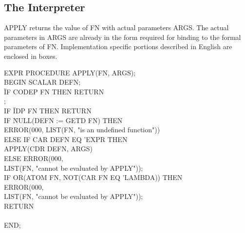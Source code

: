 \documentclass[11pt,letterpaper]{book}
\begin{document}
\subsection{The Interpreter}
\label{interpreter}
{APPLY returns the value of FN with actual parameters ARGS. The actual
parameters in ARGS are already in the form required for binding to the
formal parameters of FN. Implementation specific portions described in
English are enclosed in boxes.

{\tt \begin{tabbing} EXPR PROCEDURE APPLY(FN, ARGS); \\ BEGIN SCALAR
DEFN; \\
\hspace*{2em}\= IF CODEP FN THEN RETURN \\
\> \hspace{1em} ; \\
\> IF \= IDP FN THEN RETURN \\
\> \> IF \= NULL(DEFN := GETD FN) THEN \\
\> \> \> ERROR(000, LIST(FN, "is an undefined function")) \\
\> \> ELSE IF CAR DEFN EQ 'EXPR THEN \\
\> \> \> APPLY(CDR DEFN, ARGS) \\
\> \> ELSE ERROR(000, \\
\> \> \> LIST(FN, "cannot be evaluated by APPLY")); \\
\> IF OR(ATOM FN, NOT(CAR FN EQ 'LAMBDA)) THEN \\
\> \> ERROR(000, \\
\> \> LIST(FN, "cannot be evaluated by APPLY")); \\
\> RETURN \\
\> \>  \\ END;
\end{tabbing}}}
\end{document}
